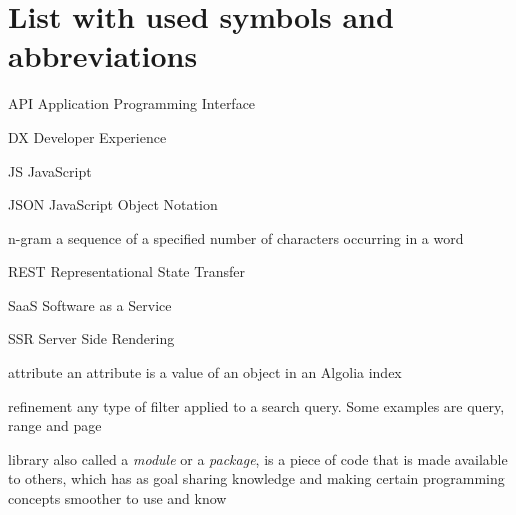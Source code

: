 
\chapter{List with used symbols and abbreviations}

\begin{abbreviations}
\item[API] Application Programming Interface
\item[DX] Developer Experience
\item[JS] JavaScript
\item[JSON] JavaScript Object Notation
\item[n-gram] a sequence of a specified number of characters occurring in a word\cite{kimbrell1988searching}
\item[REST] Representational State Transfer\cite{fielding2000architectural}
\item[SaaS] Software as a Service
\item[SSR] Server Side Rendering
\item[attribute] an attribute is a value of an object in an Algolia index
\item[refinement] any type of filter applied to a search query. Some examples are query, range and page
\item[library] also called a \emph{module} or a \emph{package}, is a piece of code that is made available to others, which has as goal sharing knowledge and making certain programming concepts smoother to use and know
\end{abbreviations}
